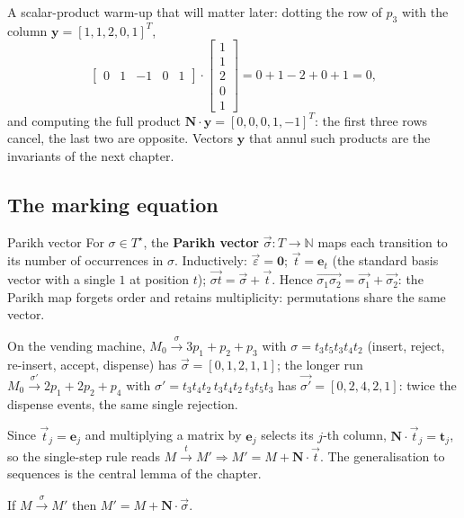 A scalar-product warm-up that will matter later: dotting the row of $p_3$ with the column $\mathbf{y} = [1, 1, 2, 0, 1]^T$,
\[
\begin{bmatrix} 0 & 1 & -1 & 0 & 1 \end{bmatrix} \cdot \begin{bmatrix} 1 \\ 1 \\ 2 \\ 0 \\ 1 \end{bmatrix} = 0 + 1 - 2 + 0 + 1 = 0,
\]
and computing the full product $\mathbf{N} \cdot \mathbf{y} = [0, 0, 0, 1, -1]^T$: the first three rows cancel, the last two are opposite. Vectors $\mathbf{y}$ that annul such products are the invariants of the next chapter.

\subsection{The marking equation}

\begin{definitionbox}{Parikh vector}
For $\sigma \in T^\star$, the \textbf{Parikh vector} $\vec{\sigma} : T \to \mathbb{N}$ maps each transition to its number of occurrences in $\sigma$. Inductively: $\vec{\varepsilon} = \mathbf{0}$; $\vec{t} = \mathbf{e}_t$ (the standard basis vector with a single $1$ at position $t$); $\vec{\sigma t} = \vec{\sigma} + \vec{t}$. Hence $\vec{\sigma_1 \sigma_2} = \vec{\sigma_1} + \vec{\sigma_2}$: the Parikh map forgets order and retains multiplicity: permutations share the same vector.
\end{definitionbox}

On the vending machine, $M_0 \xrightarrow{\sigma} 3p_1 + p_2 + p_3$ with $\sigma = t_3 t_5 t_3 t_4 t_2$ (insert, reject, re-insert, accept, dispense) has $\vec{\sigma} = [0, 1, 2, 1, 1]$; the longer run $M_0 \xrightarrow{\sigma'} 2p_1 + 2p_2 + p_4$ with $\sigma' = t_3 t_4 t_2\, t_3 t_4 t_2\, t_3 t_5 t_3$ has $\vec{\sigma'} = [0, 2, 4, 2, 1]$: twice the dispense events, the same single rejection.

Since $\vec{t}_j = \mathbf{e}_j$ and multiplying a matrix by $\mathbf{e}_j$ selects its $j$-th column, $\mathbf{N} \cdot \vec{t}_j = \mathbf{t}_j$, so the single-step rule reads $M \xrightarrow{t} M' \Rightarrow M' = M + \mathbf{N} \cdot \vec{t}$. The generalisation to sequences is the central lemma of the chapter.

\begin{lemma}
If $M \xrightarrow{\sigma} M'$ then $M' = M + \mathbf{N} \cdot \vec{\sigma}$.
\end{lemma}

